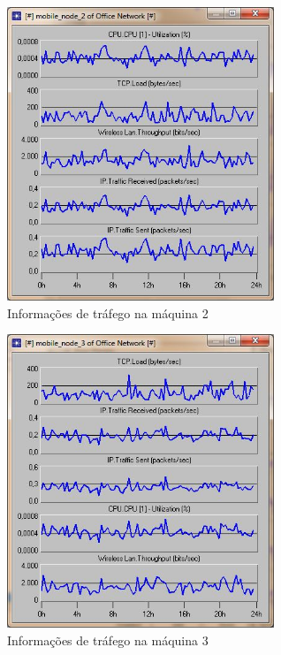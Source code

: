 \documentclass[brazil,times,12pt]{abnt}
\begin{document}
\begin{figure}[H]
\begin{center}
  \includegraphics[width=80mm]{SimulacaoRede/Maquina2.jpg}
  \caption[trafego-maquina2]{Informações de tráfego na máquina 2}
  \label{trafego-maquina2}
\end{center}
\end{figure}

\begin{figure}[H]
\begin{center}
  \includegraphics[width=80mm]{SimulacaoRede/Maquina3.jpg}
  \caption[trafego-maquina3]{Informações de tráfego na máquina 3}
  \label{trafego-maquina3}
\end{center}
\end{figure}
\end{document}

